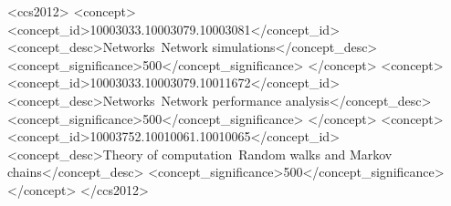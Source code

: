 
\begin{CCSXML}
	<ccs2012>
	<concept>
		<concept_id>10003033.10003079.10003081</concept_id>
		<concept_desc>Networks~Network simulations</concept_desc>
		<concept_significance>500</concept_significance>
	</concept>
	<concept>
		<concept_id>10003033.10003079.10011672</concept_id>
		<concept_desc>Networks~Network performance analysis</concept_desc>
		<concept_significance>500</concept_significance>
	</concept>
	<concept>
		<concept_id>10003752.10010061.10010065</concept_id>
		<concept_desc>Theory of computation~Random walks and Markov chains</concept_desc>
		<concept_significance>500</concept_significance>
	</concept>
	</ccs2012>
\end{CCSXML}


